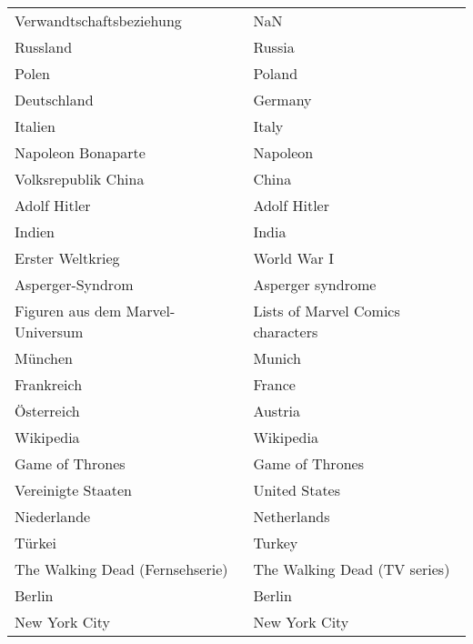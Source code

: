 \begin{tabular}{ll}
                 Verwandtschaftsbeziehung &                                                NaN \\
                                 Russland &                                             Russia \\
                                    Polen &                                             Poland \\
                              Deutschland &                                            Germany \\
                                  Italien &                                              Italy \\
                       Napoleon Bonaparte &                                           Napoleon \\
                      Volksrepublik China &                                              China \\
                             Adolf Hitler &                                       Adolf Hitler \\
                                   Indien &                                              India \\
                         Erster Weltkrieg &                                        World War I \\
                         Asperger-Syndrom &                                  Asperger syndrome \\
         Figuren aus dem Marvel-Universum &                  Lists of Marvel Comics characters \\
                                  München &                                             Munich \\
                               Frankreich &                                             France \\
                               Österreich &                                            Austria \\
                                Wikipedia &                                          Wikipedia \\
                          Game of Thrones &                                    Game of Thrones \\
                       Vereinigte Staaten &                                      United States \\
                              Niederlande &                                        Netherlands \\
                                   Türkei &                                             Turkey \\
          The Walking Dead (Fernsehserie) &                       The Walking Dead (TV series) \\
                                   Berlin &                                             Berlin \\
                            New York City &                                      New York City \\
\bottomrule
\end{tabular}
